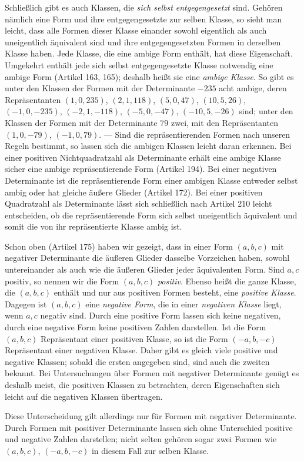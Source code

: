 Schließlich gibt es auch Klassen, die \textit{sich selbst entgegengesetzt} sind. Gehören nämlich eine Form und ihre entgegengesetzte zur selben Klasse, so sieht man leicht, dass alle Formen dieser Klasse einander sowohl eigentlich als auch uneigentlich äquivalent sind und ihre entgegengesetzten Formen in derselben Klasse haben. Jede Klasse, die eine ambige Form enthält, hat diese Eigenschaft. Umgekehrt enthält jede sich selbst entgegengesetzte Klasse notwendig eine ambige Form (Artikel 163, 165); deshalb heißt sie eine \textit{ambige Klasse}. So gibt es unter den Klassen der Formen mit der Determinante $-235$ acht ambige, deren Repräsentanten $(1,0,235)$, $(2,1,118)$, $(5,0,47)$, $(10,5,26)$, $(-1,0,-235)$, $(-2,1,-118)$, $(-5,0,-47)$, $(-10,5,-26)$ sind; unter den Klassen der Formen mit der Determinante $79$ zwei, mit den Repräsentanten $(1,0,-79)$, $(-1,0,79)$. --- Sind die repräsentierenden Formen nach unseren Regeln bestimmt, so lassen sich die ambigen Klassen leicht daran erkennen. Bei einer positiven Nichtquadratzahl als Determinante erhält eine ambige Klasse sicher eine ambige repräsentierende Form (Artikel 194). Bei einer negativen Determinante ist die repräsentierende Form einer ambigen Klasse entweder selbst ambig oder hat gleiche äußere Glieder (Artikel 172). Bei einer positiven Quadratzahl als Determinante lässt sich schließlich nach Artikel 210 leicht entscheiden, ob die repräsentierende Form sich selbst uneigentlich äquivalent und somit die von ihr repräsentierte Klasse ambig ist.

Schon oben (Artikel 175) haben wir gezeigt, dass in einer Form $(a,b,c)$ mit negativer Determinante die äußeren Glieder dasselbe Vorzeichen haben, sowohl untereinander als auch wie die äußeren Glieder jeder äquivalenten Form. Sind $a,c$ positiv, so nennen wir die Form $(a,b,c)$ \textit{positiv}. Ebenso heißt die ganze Klasse, die $(a,b,c)$ enthält und nur aus positiven Formen besteht, eine \textit{positive Klasse}. Dagegen ist $(a,b,c)$ eine \textit{negative Form}, die in einer \textit{negativen Klasse} liegt, wenn $a,c$ negativ sind. Durch eine positive Form lassen sich keine negativen, durch eine negative Form keine positiven Zahlen darstellen. Ist die Form $(a,b,c)$ Repräsentant einer positiven Klasse, so ist die Form $(-a,b,-c)$ Repräsentant einer negativen Klasse. Daher gibt es gleich viele positive und negative Klassen; sobald die ersten angegeben sind, sind auch die zweiten bekannt. Bei Untersuchungen über Formen mit negativer Determinante genügt es deshalb meist, die positiven Klassen zu betrachten, deren Eigenschaften sich leicht auf die negativen Klassen übertragen.

Diese Unterscheidung gilt allerdings nur für Formen mit negativer Determinante. Durch Formen mit positiver Determinante lassen sich ohne Unterschied positive und negative Zahlen darstellen; nicht selten gehören sogar zwei Formen wie $(a,b,c)$, $(-a,b,-c)$ in diesem Fall zur selben Klasse.
